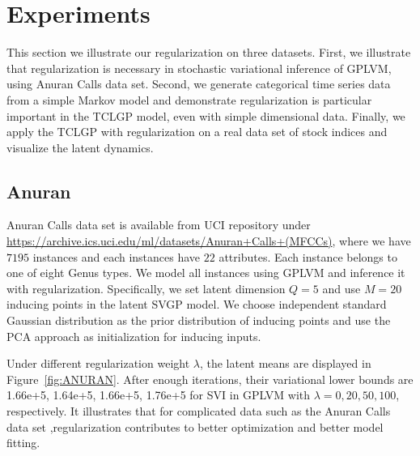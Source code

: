 \documentclass{article}
\begin{document}
\section{Experiments} \label{sec:E}
This section we illustrate our regularization on three datasets. First, we illustrate that regularization is necessary in stochastic variational inference of GPLVM, using Anuran Calls data set. Second, we generate categorical time series data from a simple Markov model and demonstrate regularization is particular important in the TCLGP model, even with simple dimensional data. Finally, we apply the TCLGP with regularization on a real data set of stock indices and visualize the latent dynamics.

\subsection{Anuran}
Anuran Calls data set is available from UCI repository under \url{https://archive.ics.uci.edu/ml/datasets/Anuran+Calls+(MFCCs)}, where we have $7195$ instances and each instances have $22$ attributes. Each instance belongs to one of eight Genus types. We model all instances using GPLVM and inference it with regularization. Specifically, we set latent dimension $Q = 5$ and use $M = 20$ inducing points in the latent SVGP model. We choose independent standard Gaussian distribution as the prior distribution of inducing points and use the PCA approach as initialization for inducing inputs.

Under different regularization weight $\lambda$, the latent means are displayed in Figure~\ref{fig:ANURAN}. After enough iterations, their variational lower bounds are 1.66e+5, 1.64e+5, 1.66e+5, 1.76e+5 for SVI in GPLVM with $\lambda = 0 ,20, 50, 100$, respectively. It illustrates that for complicated data such as the Anuran Calls data set ,regularization contributes to better optimization and better model fitting.
\end{document}
